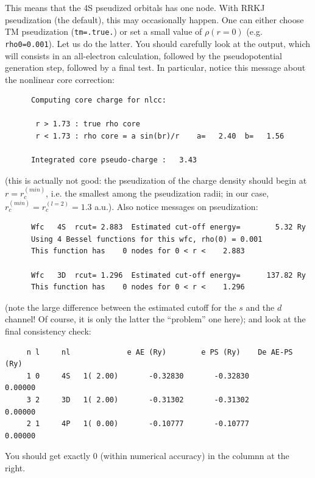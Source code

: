 \documentclass[12pt,a4paper]{article}
\begin{document}
This means that the 4S pseudized orbitals has one node. With RRKJ 
pseudization (the default), this may occasionally happen. One can
either choose TM pseudization (\texttt{tm=.true.}) or set a small
value of $\rho(r=0)$ (e.g. \texttt{rho0=0.001}). Let us do the latter.
You should carefully look at the output, which will consists in
an all-electron calculation, followed by the pseudopotential generation
step, followed by a final test. In particular, notice this message
about the nonlinear core correction:
\begin{verbatim}
      Computing core charge for nlcc:

       r > 1.73 : true rho core
       r < 1.73 : rho core = a sin(br)/r    a=   2.40  b=   1.56

      Integrated core pseudo-charge :   3.43
\end{verbatim}
(this is actually not good: the pseudization of the charge density 
should begin at $r= r_c^{(min)}$, i.e. the smallest among the pseudization 
radii; in our case, $r_c^{(min)} = r_c^{(l=2)}=1.3$ a.u.). 
Also notice messages on pseudization:
\begin{verbatim}
      Wfc   4S  rcut= 2.883  Estimated cut-off energy=        5.32 Ry
      Using 4 Bessel functions for this wfc, rho(0) = 0.001
      This function has    0 nodes for 0 < r <    2.883

      Wfc   3D  rcut= 1.296  Estimated cut-off energy=      137.82 Ry
      This function has    0 nodes for 0 < r <    1.296
\end{verbatim}
(note the large difference between the estimated cutoff for the $s$ and
the $d$ channel! Of course, it is only the latter the ``problem'' one 
here); and look at the final consistency check:
\begin{verbatim}
     n l     nl             e AE (Ry)        e PS (Ry)    De AE-PS (Ry)
     1 0     4S   1( 2.00)       -0.32830       -0.32830        0.00000
     3 2     3D   1( 2.00)       -0.31302       -0.31302        0.00000
     2 1     4P   1( 0.00)       -0.10777       -0.10777        0.00000
\end{verbatim}
You should get exactly 0 (within numerical accuracy) in the columnn
at the right. 
\end{document}

